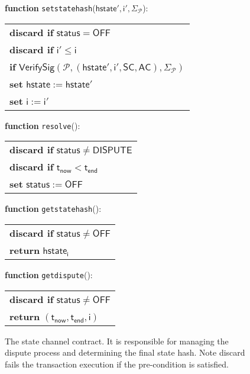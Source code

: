 \documentclass{article}
\newcommand{\chanstatus}{\mathsf{status}}
\newcommand{\chandispute}{\mathsf{DISPUTE}}
\newcommand{\chanoff}{\mathsf{OFF}}
\newcommand{\hstate}{\mathsf{hstate}}
\newcommand{\hstatei}{\mathsf{hstate}_{\monotoniccounter}}
\newcommand{\monotoniccounter}{\mathsf{i}}
\newcommand{\participant}{\mathcal{P}}
\newcommand{\statechannel}{\mathsf{SC}}
\newcommand{\verifysig}{\mathsf{VerifySig}}
\newcommand{\appcontract}{\mathsf{AC}}
\newcommand{\timenow}{\mathsf{t}_{\mathsf{now}}}
\newcommand{\timeend}{\mathsf{t}_{\mathsf{end}}}
\newcommand{\oninput}{\textcolor{entry}{\bf function }}
\newcommand{\stringlitt}[1]{\texttt{\textcolor{string}{#1}}}
\begin{document}
\begin{figure}[h]
\begin{boxedminipage}{\columnwidth}
		
		\begin{flushleft}
			\oninput  \stringlitt{setstatehash}($\hstate', \monotoniccounter', \Sigma_{\participant}$):
		\end{flushleft}
		\begin{tabular}{l}
			\quad \textbf{discard if} $\chanstatus = \chanoff$ \\
			\quad \textbf{discard if} $\monotoniccounter' \leq \monotoniccounter$ \\
			\quad \textbf{if} $\verifysig(\participant, (\hstate', \monotoniccounter', \statechannel, \appcontract), \Sigma_{\participant})$ \\
			\quad \quad \textbf{set} $\hstate := \hstate'$ \\
			\quad \quad \textbf{set} $\monotoniccounter := \monotoniccounter'$ \\
		\end{tabular}
		
		\begin{flushleft} 
			\oninput \stringlitt{resolve}(): 
		\end{flushleft}
		\begin{tabular}{l}
		\quad \textbf{discard if} $\chanstatus \neq \chandispute$ \\
		\quad \textbf{discard if} $\timenow < \timeend$ \\
		\quad \textbf{set} $\chanstatus := \chanoff$ 
		\end{tabular}
	
		\begin{flushleft} 
		\oninput \stringlitt{getstatehash}(): 
		\end{flushleft}
		\begin{tabular}{l}
		\quad \textbf{discard if} $\chanstatus \neq \chanoff$ \\
		\quad \textbf{return} $\hstatei$
		\end{tabular}
		
		\begin{flushleft} 
			\oninput \stringlitt{getdispute}(): 
		\end{flushleft}
		\begin{tabular}{l}
			\quad \textbf{discard if} $\chanstatus \neq \chanoff$ \\
			\quad \textbf{return} $(\timenow, \timeend, \monotoniccounter)$
		\end{tabular}
	\end{boxedminipage}
	\caption{The state channel contract. It is responsible for managing the dispute process and determining the final state hash. Note discard fails the transaction execution if the pre-condition is satisfied.}
\end{figure}
\end{document}
